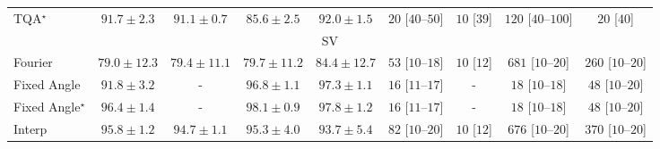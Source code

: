 \begin{tabular}{l|cccc|cccc|}
TQA$^\star$ & {\cellcolor[HTML]{31974F}} \color[HTML]{F1F1F1} $91.7\pm 2.3$ & {\cellcolor[HTML]{389F55}} \color[HTML]{F1F1F1} $91.1\pm 0.7$ & {\cellcolor[HTML]{9FD788}} \color[HTML]{000000} $85.6\pm 2.5$ & {\cellcolor[HTML]{2E924C}} \color[HTML]{F1F1F1} $92.0\pm 1.5$ & {\cellcolor[HTML]{FFF5F1}} \color[HTML]{000000} $20$ [$40$--$50$] & {\cellcolor[HTML]{FFF7F3}} \color[HTML]{000000} $10$ [$39$] & {\cellcolor[HTML]{FDD8D5}} \color[HTML]{000000} $120$ [$40$--$100$] & {\cellcolor[HTML]{FFF5F1}} \color[HTML]{000000} $20$ [$40$] \\
\cline{1-9}
\multicolumn{9}{c}{\rule{0pt}{8pt}SV} \\
\midrule
Fourier & {\cellcolor[HTML]{F0EAF4}} \color[HTML]{000000} $79.0\pm 12.3$ & {\cellcolor[HTML]{EDE8F3}} \color[HTML]{000000} $79.4\pm 11.1$ & {\cellcolor[HTML]{EAE6F1}} \color[HTML]{000000} $79.7\pm 11.2$ & {\cellcolor[HTML]{ADC1DD}} \color[HTML]{000000} $84.4\pm 12.7$ & {\cellcolor[HTML]{FEEBE8}} \color[HTML]{000000} $53$ [$10$--$18$] & {\cellcolor[HTML]{FFF7F3}} \color[HTML]{000000} $10$ [$12$] & {\cellcolor[HTML]{49006A}} \color[HTML]{F1F1F1} $681$ [$10$--$20$] & {\cellcolor[HTML]{FAA0B5}} \color[HTML]{000000} $260$ [$10$--$20$] \\
Fixed Angle & {\cellcolor[HTML]{1B7EB7}} \color[HTML]{F1F1F1} $91.8\pm 3.2$ & {\cellcolor[HTML]{000000}} \color[HTML]{F1F1F1} {\cellcolor{white}} \color{black} - & {\cellcolor[HTML]{034B76}} \color[HTML]{F1F1F1} $96.8\pm 1.1$ & {\cellcolor[HTML]{03466E}} \color[HTML]{F1F1F1} $97.3\pm 1.1$ & {\cellcolor[HTML]{FFF6F2}} \color[HTML]{000000} $16$ [$11$--$17$] & {\cellcolor[HTML]{000000}} \color[HTML]{F1F1F1} {\cellcolor{white}} \color{black} - & {\cellcolor[HTML]{FFF5F1}} \color[HTML]{000000} $18$ [$10$--$18$] & {\cellcolor[HTML]{FEEDE9}} \color[HTML]{000000} $48$ [$10$--$20$] \\
Fixed Angle$^\star$ & {\cellcolor[HTML]{03517E}} \color[HTML]{F1F1F1} $96.4\pm 1.4$ & {\cellcolor[HTML]{000000}} \color[HTML]{F1F1F1} {\cellcolor{white}} \color{black} - & {\cellcolor[HTML]{023B5D}} \color[HTML]{F1F1F1} $98.1\pm 0.9$ & {\cellcolor[HTML]{023F64}} \color[HTML]{F1F1F1} $97.8\pm 1.2$ & {\cellcolor[HTML]{FFF6F2}} \color[HTML]{000000} $16$ [$11$--$17$] & {\cellcolor[HTML]{000000}} \color[HTML]{F1F1F1} {\cellcolor{white}} \color{black} - & {\cellcolor[HTML]{FFF5F1}} \color[HTML]{000000} $18$ [$10$--$18$] & {\cellcolor[HTML]{FEEDE9}} \color[HTML]{000000} $48$ [$10$--$20$] \\
Interp & {\cellcolor[HTML]{04588A}} \color[HTML]{F1F1F1} $95.8\pm 1.2$ & {\cellcolor[HTML]{046299}} \color[HTML]{F1F1F1} $94.7\pm 1.1$ & {\cellcolor[HTML]{045D92}} \color[HTML]{F1F1F1} $95.3\pm 4.0$ & {\cellcolor[HTML]{056AA6}} \color[HTML]{F1F1F1} $93.7\pm 5.4$ & {\cellcolor[HTML]{FDE4E0}} \color[HTML]{000000} $82$ [$10$--$20$] & {\cellcolor[HTML]{FFF7F3}} \color[HTML]{000000} $10$ [$12$] & {\cellcolor[HTML]{4B006A}} \color[HTML]{F1F1F1} $676$ [$10$--$20$] & {\cellcolor[HTML]{EF599E}} \color[HTML]{F1F1F1} $370$ [$10$--$20$] \\

\end{tabular}
